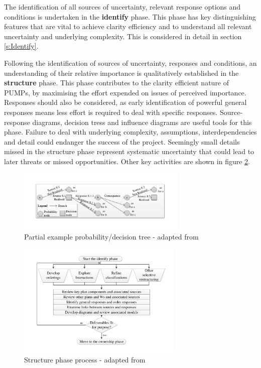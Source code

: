 The identification of all sources of uncertainty, relevant response options and conditions is undertaken in the \textbf{identify} phase.
This phase has key distinguishing features that are vital to achieve clarity efficiency and to understand all relevant uncertainty and underlying complexity.
This is considered in detail in section \ref{s:Identify}.

Following the identification of sources of uncertainty, responses and conditions, an understanding of their relative importance is qualitatively established in the \textbf{structure} phase.
This phase contributes to the clarity efficient nature of PUMPs, by maximising the effort expended on issues of perceived importance.
Responses should also be considered, as early identification of powerful general responses means less effort is required to deal with specific responses.
Source-response diagrams, decision tress and influence diagrams are useful tools for this phase.
Failure to deal with underlying complexity, assumptions, interdependencies and detail could endanger the success of the project.
Seemingly small details missed in the structure phase represent systematic uncertainty that could lead to later threats or missed opportunities.
Other key activities are shown in figure \ref{Figure:Structure}.

\begin{figure}[!h]
  \centering
    \includegraphics[height = 2.95cm]{./Figures/DecisionTreeChapman79.pdf} 
\caption{Partial example probability/decision tree - adapted from \cite{SCERT}}
\label{Figure:Decisiontree}
\end{figure}

\begin{figure}[!h]
  \centering
    \includegraphics[width = 0.7\textwidth]{./Figures/Structure.pdf} 
\caption{Structure phase process - adapted from \cite{chapman}}
\label{Figure:Structure}
\end{figure}

